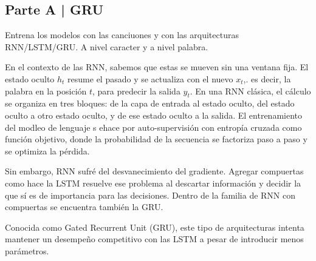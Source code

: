 \newpage

\begin{myblock}
\section*{Parte A | GRU}

    Entrena los modelos con las canciuones y con las arquitecturas RNN/LSTM/GRU. A nivel
    caracter y a nivel palabra.

\end{myblock}




En el contexto de las RNN, sabemos que estas se mueven sin una ventana fija. El estado oculto $h_t$ resume el pasado y se actualiza con el nuevo $x_t$,. es decir, la palabra en la posición $t$, para predecir la salida $y_t$. En una RNN clásica, el cálculo se organiza en tres bloques: de la capa de entrada al estado oculto, del estado oculto a otro estado oculto, y de ese estado oculto a la salida. El entrenamiento del modleo de lenguaje s ehace por auto-supervisión con entropía cruzada como función objetivo, donde la probabilidad de la secuencia se factoriza paso a paso y se optimiza la pérdida. 

Sin embargo, RNN sufré del desvanecimiento del gradiente. Agregar compuertas como hace la LSTM resuelve ese problema al descartar información y decidir la que sí es de importancia para las decisiones. Dentro de la familia de RNN con compuertas se encuentra también la GRU. 

Conocida como Gated Recurrent Unit (GRU), este tipo de arquitecturas intenta mantener un desempeño competitivo con las LSTM a pesar de introducir menos parámetros. 

